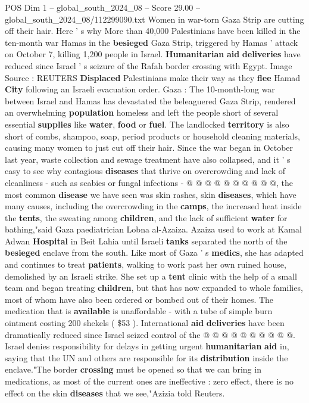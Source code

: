 \begin{textsample}{POS Dim 1 – global\_south\_2024\_08 – Score 29.00 – global\_south\_2024\_08/112299090.txt}  \label{ex:f1_pos_323}
Women in war-torn Gaza Strip are cutting off their hair.
Here ' s why More than 40,000 Palestinians have been killed in the ten-month war Hamas in the \textbf{besieged} Gaza Strip, triggered by Hamas ' attack on October 7, killing 1,200 people in Israel. \textbf{Humanitarian} \textbf{aid} \textbf{deliveries} have reduced since Israel ' s seizure of the Rafah border crossing with Egypt.
Image Source : REUTERS \textbf{Displaced} Palestinians make their way as they \textbf{flee} Hamad \textbf{City} following an Israeli evacuation order.
Gaza : The 10-month-long war between Israel and Hamas has devastated the beleaguered Gaza Strip, rendered an overwhelming \textbf{population} homeless and left the people short of several essential \textbf{supplies} like \textbf{water}, \textbf{food} or \textbf{fuel}.
The landlocked \textbf{territory} is also short of combs, shampoo, soap, period products or household cleaning materials, causing many women to just cut off their hair.
Since the war began in October last year, waste collection and sewage treatment have also collapsed, and it ' s easy to see why contagious \textbf{diseases} that thrive on overcrowding and lack of cleanliness - such as scabies or fungal infections - @ @ @ @ @ @ @ @ @ @, the most common \textbf{disease} we have seen was skin rashes, skin \textbf{diseases}, which have many causes, including the overcrowding in the \textbf{camps}, the increased heat inside the \textbf{tents}, the sweating among \textbf{children}, and the lack of sufficient \textbf{water} for bathing,"said Gaza paediatrician Lobna al-Azaiza.
Azaiza used to work at Kamal Adwan \textbf{Hospital} in Beit Lahia until Israeli \textbf{tanks} separated the north of the \textbf{besieged} enclave from the south.
Like most of Gaza ' s \textbf{medics}, she has adapted and continues to treat \textbf{patients}, walking to work past her own ruined house, demolished by an Israeli strike.
She set up a \textbf{tent} clinic with the help of a small team and began treating \textbf{children}, but that has now expanded to whole families, most of whom have also been ordered or bombed out of their homes.
The medication that is \textbf{available} is unaffordable - with a tube of simple burn ointment costing 200 shekels ( \$53 ).
International \textbf{aid} \textbf{deliveries} have been dramatically reduced since Israel seized control of the @ @ @ @ @ @ @ @ @ @.
Israel denies responsibility for delays in getting urgent \textbf{humanitarian} \textbf{aid} in, saying that the UN and others are responsible for its \textbf{distribution} inside the enclave."The border \textbf{crossing} must be opened so that we can bring in medications, as most of the current ones are ineffective : zero effect, there is no effect on the skin \textbf{diseases} that we see,"Azizia told Reuters.

\end{textsample}
